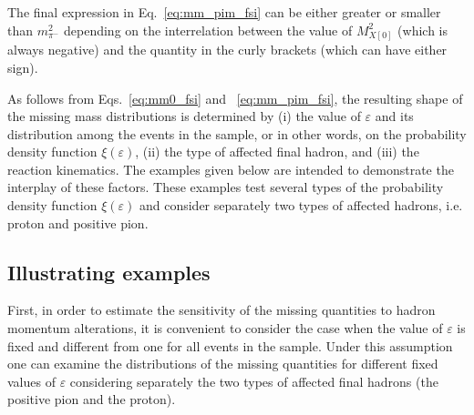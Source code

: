 The final expression in Eq.~\eqref{eq:mm_pim_fsi} can be either greater or smaller than $m_{\pi^{-}}^{2}$ depending on the interrelation between the value of $M_{X[0]}^{2}$ (which is always negative) and the quantity in the curly brackets (which can have either sign).


As follows from Eqs.~\ref{eq:mm0_fsi} and ~\ref{eq:mm_pim_fsi}, the resulting shape of the missing mass distributions is determined by (i) the value of $\varepsilon$ and its distribution among the events in the sample, or in other words, on the probability density function $\xi(\varepsilon)$, (ii) the type of affected final hadron, and (iii) the reaction kinematics. The examples given below are intended to demonstrate the interplay of these factors. These examples test several types of the probability density function $\xi(\varepsilon)$ and consider separately two types of affected hadrons, i.e. proton and positive pion.


\subsection{Illustrating examples}

\vspace{-0.325em}

First, in order to estimate the sensitivity of the missing quantities to hadron momentum alterations, it is convenient to consider the case when the value of $\varepsilon$ is fixed and different from one for all events in the sample. Under this assumption one can examine the distributions of the missing quantities for different fixed values of $\varepsilon$ considering separately the two types of affected final hadrons (the positive pion and the proton).




